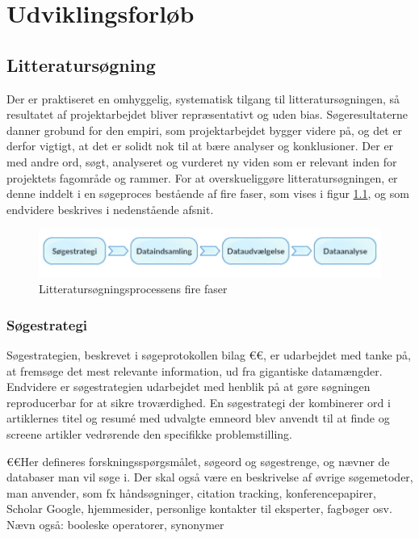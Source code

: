 \chapter{Udviklingsforløb}

\section{Litteratursøgning}

Der er praktiseret en omhyggelig, systematisk tilgang til litteratursøgningen, så resultatet af projektarbejdet bliver repræsentativt og uden bias. Søgeresultaterne danner grobund for den empiri, som projektarbejdet bygger videre på, og det er derfor vigtigt, at det er solidt nok til at bære analyser og konklusioner. Der er med andre ord, søgt, analyseret og vurderet ny viden som er relevant inden for projektets fagområde og rammer. For at overskueliggøre litteratursøgningen, er denne inddelt i en søgeproces bestående af fire faser, som vises i figur \ref{fig:littpro}, og som endvidere beskrives i nedenstående afsnit.  \\

	\begin{figure}[htb]
			\centering
				\includegraphics[width=5in]{Littproces}
				\caption{Litteratursøgningsprocessens fire faser}	
				\label{fig:littpro}
	\end{figure}
	
	\subsection{Søgestrategi}
	Søgestrategien, beskrevet i søgeprotokollen bilag €€, er udarbejdet med tanke på, at fremsøge det mest relevante information, ud fra gigantiske datamængder. Endvidere er søgestrategien udarbejdet med henblik på at gøre søgningen reproducerbar for at sikre troværdighed.  
	En søgestrategi der kombinerer ord i artiklernes titel og resumé med udvalgte emneord blev anvendt til at finde og screene artikler vedrørende den specifikke problemstilling. 
	
	 €€Her defineres forskningsspørgsmålet, søgeord og søgestrenge, og nævner de databaser man vil søge i. Der skal også være en beskrivelse af øvrige søgemetoder, man anvender, som fx håndsøgninger, citation tracking, konferencepapirer, Scholar Google, hjemmesider, personlige kontakter til eksperter, fagbøger osv. 
		Nævn også: booleske operatorer, synonymer 
	
